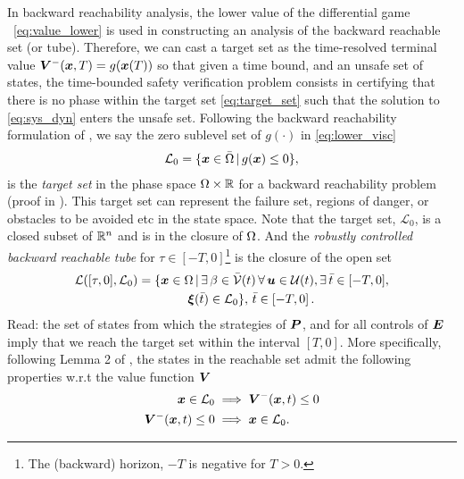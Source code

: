 In backward reachability analysis, the lower value of the differential game \ie ~\eqref{eq:value_lower} is used in constructing an analysis of the backward reachable set (or tube). Therefore, we can cast a target set as the time-resolved terminal value $\bm{V}^-(\bm{x}, T) = g(\bm{x}(T))$ so that given a time bound, and an unsafe set of states, the time-bounded safety verification problem consists in certifying that there is no phase within the target set \eqref{eq:target_set} such that the solution to \eqref{eq:sys_dyn} enters the unsafe set. Following the backward reachability formulation of \cite{Mitchell2005}, we say the zero sublevel set of $g(\cdot)$ in \eqref{eq:lower_visc} \ie
%
\begin{align}
	\mathcal{L}_0 = \{ \state \in \bar{\Omega} \,|\, g(\state) \le 0 \},
	\label{eq:target_set}
\end{align}
%
is the \textit{target set} in the phase space $\Omega \times \mathbb{R}$ for a backward reachability problem (proof in \cite{Mitchell2005}). This target set can represent the failure set, regions of danger, or obstacles to be avoided etc in the state space. Note that the target set, $\mathcal{L}_0$, is a closed subset of $\mathbb{R}^n$ and is in the closure of $\Omega$. And the \textit{robustly controlled backward reachable tube} for $\tau \in [-T, 0]$\footnote{The (backward) horizon, $-T$ is negative for $T>0$.} is the closure of the open set
%
\begin{align}
	\mathcal{L}([\tau, 0], \mathcal{L}_0) &= \{\state \in \openset \,| \, \exists \, \beta \in \mathcal{\bar{V}}(t) \,  \forall \, \bm{u} \in \mathcal{U}(t), \exists \, \bar{t} \in [-T, 0], \nonumber \\
	& \qquad  \qquad \bm{\xi}(\bar{t})%
	 \in  \mathcal{L}_0 \}, \,\bar{t} \in \left[-T, 0\right].
	 \label{eq:rcbrt}
\end{align}
%
Read: the set of states from which the strategies of $\bm{P}$, and for all controls of $\bm{E}$ imply that we reach the target set within the interval $[T, 0]$.   More specifically, following Lemma 2 of \cite{Mitchell2005}, the states in the reachable set admit the following properties w.r.t the value function $\bm{V}$
%
\begin{subequations}
	\begin{align}
		\bm{x} \in \mathcal{L}_0 &\implies \bm{V}^-(\bm{x}, t) \le 0 \\
		\bm{V}^-(\bm{x}, t) \le 0 &\implies \bm{x} \in \mathcal{L}_0.
	\end{align}
\end{subequations}

